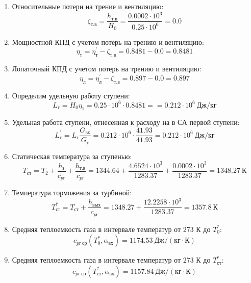 \documentclass[a4paper,12pt]{article}
\begin{document}
\begin{enumerate}
        \item Относительные потери на трение и вентиляцию:
        \[
            \zeta_{т.в} = \frac{ h_{т.в} }{ H_0 } =
                \frac{ 0.0002 \cdot 10^3 }{ 0.25 \cdot 10^6 } =
            0.0
        \]

        \item Мощностной КПД с учетом потерь на трению и вентиляцию:
        \[
            \eta_т = \eta_т^\prime - \zeta_{т.в} =
                0.8481 - 0.0 =
            0.8481
        \]

        \item Лопаточный КПД с учетом потерь на трению и вентиляцию:
        \[
            \eta_л = \eta_л^\prime - \zeta_{т.в} =
                0.897 - 0.0 =
            0.897
        \]

        \item Определим удельную работу ступени:
        \[
            L_т = H_0 \eta_т = 0.25 \cdot 10^6 \cdot 0.8481 =
            = 0.212 \cdot 10^6 \ Дж/кг
        \]

        \item Удельная работа ступени, отнесенная к расходу на в СА первой ступени:
        \[
            L_т^\prime = L_т \frac{ G_{вх} }{ G_т }  =
                0.212 \cdot 10^6 \cdot
                \frac{ 41.93 }{ 41.93 } =
            0.212 \cdot 10^6 \ Дж/кг
        \]

        \item Статическая температура за ступенью:
        \[
            T_{ст} = T_2 + \frac{ h_з }{ c_{pг} } + \frac{ h_{т.в} }{ c_{pг} } =
                1344.64 +
                \frac{4.6524 \cdot 10^3 }{ 1283.37 } +
                \frac{ 0.0002 \cdot 10^3 }{ 1283.37 } =
            1348.27 \ К
        \]

        \item Температура торможения за турбиной:
        \[
            T_{ст}^* = T_{ст} + \frac{ h_{вых} }{ c_{pг} } =
                1348.27 +
                \frac{ 12.2258 \cdot 10^3 }{ 1283.37 } =
            1357.8 \ К
        \]

        \item Средняя теплоемкость газа в интервале температур от 273 К до $T_0^*$:
        \[
            c_{pг\ ср} (T_0^*, \alpha_{вх}) =
            1174.53 \ Дж/(кг \cdot К)
        \]

        \item Средняя теплоемкость газа в интервале температур от 273 К до $T_{ст}^*$:
        \[
            c_{pг\ ср} (T_{ст}^*, \alpha_{вх}) =
            1157.84 \ Дж/(кг \cdot К)
        \]


\end{enumerate}
\end{document}
